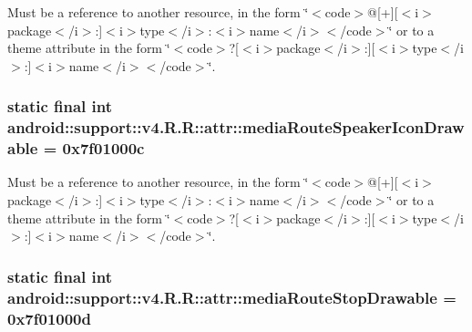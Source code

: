 Must be a reference to another resource, in the form \char`\"{}$<$code$>$@\mbox{[}+\mbox{]}\mbox{[}$<$i$>$package$<$/i$>$:\mbox{]}$<$i$>$type$<$/i$>$:$<$i$>$name$<$/i$>$$<$/code$>$\char`\"{} or to a theme attribute in the form \char`\"{}$<$code$>$?\mbox{[}$<$i$>$package$<$/i$>$:\mbox{]}\mbox{[}$<$i$>$type$<$/i$>$:\mbox{]}$<$i$>$name$<$/i$>$$<$/code$>$\char`\"{}. \hypertarget{classandroid_1_1support_1_1v4_1_1_r_1_1attr_c143998f37fa865799adeda6207cdaf9}{
\subsubsection[{mediaRouteSpeakerIconDrawable}]{\setlength{\rightskip}{0pt plus 5cm}static final int android::support::v4.R.R::attr::mediaRouteSpeakerIconDrawable = 0x7f01000c}}
\label{classandroid_1_1support_1_1v4_1_1_r_1_1attr_c143998f37fa865799adeda6207cdaf9}


Must be a reference to another resource, in the form \char`\"{}$<$code$>$@\mbox{[}+\mbox{]}\mbox{[}$<$i$>$package$<$/i$>$:\mbox{]}$<$i$>$type$<$/i$>$:$<$i$>$name$<$/i$>$$<$/code$>$\char`\"{} or to a theme attribute in the form \char`\"{}$<$code$>$?\mbox{[}$<$i$>$package$<$/i$>$:\mbox{]}\mbox{[}$<$i$>$type$<$/i$>$:\mbox{]}$<$i$>$name$<$/i$>$$<$/code$>$\char`\"{}. \hypertarget{classandroid_1_1support_1_1v4_1_1_r_1_1attr_f07c12ce0ae4e05c30b814c3640d7841}{
\subsubsection[{mediaRouteStopDrawable}]{\setlength{\rightskip}{0pt plus 5cm}static final int android::support::v4.R.R::attr::mediaRouteStopDrawable = 0x7f01000d}}
\label{classandroid_1_1support_1_1v4_1_1_r_1_1attr_f07c12ce0ae4e05c30b814c3640d7841}


